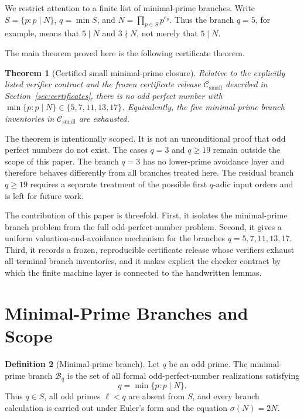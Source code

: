 \documentclass[11pt]{article}
\newtheorem{theorem}{Theorem}[section]
\theoremstyle{definition}
\newtheorem{definition}[theorem]{Definition}
\theoremstyle{remark}
\newcommand{\B}{\mathcal B}
\newcommand{\Csmall}{\ensuremath{\mathcal C_{\mathrm{small}}}}
\begin{document}
We restrict attention to a finite list of minimal-prime branches.  Write
\(S=\{p:p\mid N\}\), \(q=\min S\), and
\(N=\prod_{p\in S}p^{e_p}\).  Thus the branch \(q=5\), for example, means that
\(5\mid N\) and \(3\nmid N\), not merely that \(5\mid N\).

The main theorem proved here is the following certificate theorem.

\begin{theorem}[Certified small minimal-prime closure]
\label{thm:intro-main}
Relative to the explicitly listed verifier contract and the frozen certificate
release \(\Csmall\) described in Section~\ref{sec:certificates}, there is
no odd perfect number with \(\min\{p:p\mid N\}\in\{5,7,11,13,17\}\).
Equivalently, the five minimal-prime branch inventories in \(\Csmall\)
are exhausted.
\end{theorem}

The theorem is intentionally scoped.  It is not an unconditional proof that odd
perfect numbers do not exist.  The cases \(q=3\) and \(q\ge19\) remain outside
the scope of this paper.
The branch \(q=3\) has no lower-prime avoidance layer and therefore behaves
differently from all branches treated here.  The residual branch \(q\ge19\)
requires a separate treatment of the possible first \(q\)-adic input orders and
is left for future work.

The contribution of this paper is threefold.  First, it isolates the
minimal-prime branch problem from the full odd-perfect-number problem.  Second,
it gives a uniform valuation-and-avoidance mechanism for the branches
\(q=5,7,11,13,17\).  Third, it records a frozen, reproducible certificate
release whose verifiers exhaust all terminal branch inventories, and it makes
explicit the checker contract by which the finite machine layer is connected
to the handwritten lemmas.

\section{Minimal-Prime Branches and Scope}
\label{sec:scope}

\begin{definition}[Minimal-prime branch]
\label{def:minimal-prime-branch}
Let \(q\) be an odd prime.  The minimal-prime branch \(\B_q\) is the set of all
formal odd-perfect-number realizations satisfying
\[
  q=\min\{p:p\mid N\}.
\]
Thus \(q\in S\), all odd primes \(\ell<q\) are absent from \(S\), and every
branch calculation is carried out under Euler's form and the equation
\(\sigma(N)=2N\).
\end{definition}
\end{document}
